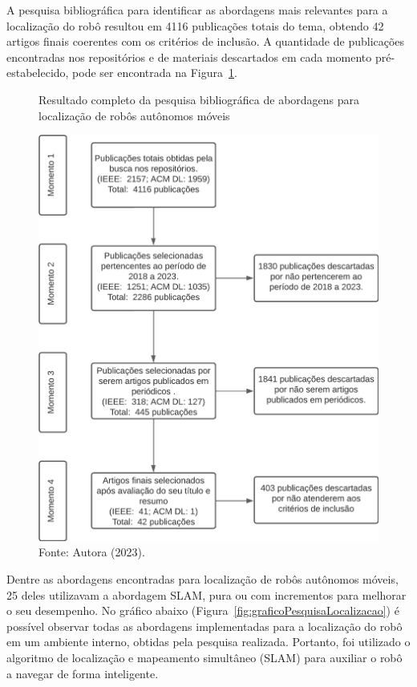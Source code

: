 A pesquisa bibliográfica para identificar as abordagens mais relevantes para a localização do robô resultou em 4116 publicações totais do tema, obtendo  42 artigos finais coerentes com os critérios de inclusão. A quantidade de publicações encontradas nos repositórios e de materiais descartados em cada momento pré-estabelecido, pode ser encontrada na Figura~\ref{fig:diagramaResultadosLocalizacao}. 

\begin{figure}[h]
    \centering
    \caption{Resultado completo da pesquisa bibliográfica de abordagens para localização de robôs autônomos móveis}
    \includegraphics[scale=0.8]{diagramaResultadosLocalizacao.png}
    \caption*{Fonte: Autora (2023).}
    \label{fig:diagramaResultadosLocalizacao}
\end{figure}

Dentre as abordagens encontradas para localização de robôs autônomos móveis, 25 deles utilizavam a abordagem SLAM, pura ou com incrementos para melhorar o seu desempenho. No gráfico abaixo (Figura~\ref{fig:graficoPesquisaLocalizacao}) é possível observar todas as abordagens implementadas para a localização do robô em um ambiente interno, obtidas pela pesquisa realizada. Portanto, foi utilizado o algoritmo de localização e mapeamento simultâneo (SLAM) para auxiliar o robô a navegar de forma inteligente.


